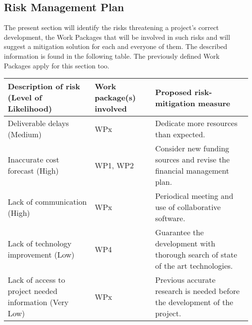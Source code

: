 \subsection{Risk Management Plan}

The present section will identify the risks threatening a project's correct development, the Work Packages that will be involved in such risks and will suggest a mitigation solution for each and everyone of them. The described information is found in the following table. The previously defined Work Packages apply for this section too.

\begin{longtable}[H]{>{\raggedright\arraybackslash}p{4cm} p{4.7cm} p{5cm}}
	
	\toprule[2pt]
	
	\textbf{Description of risk (Level of Likelihood)} & \textbf{Work package(s) involved} & \textbf{Proposed risk-mitigation measure} \\
	
	\midrule[1.5pt] 
	\endhead
	
	Deliverable delays (Medium) & WPx & Dedicate more resources than expected. \vspace{0.2cm} \\
	
	\midrule
	
	Inaccurate cost forecast (High) & WP1, WP2 & Consider new funding sources and revise the financial management plan. \vspace{0.2cm} \\
	
	\midrule
	
	Lack of communication (High) & WPx & Periodical meeting and use of collaborative software.  \vspace{0.2cm} \\
	
	\midrule
	
	Lack of technology improvement (Low) & WP4 & Guarantee the development with thorough search of state of the art technologies.  \vspace{0.2cm} \\
	
	\midrule
	
	Lack of access to project needed information (Very Low) & WPx & Previous accurate research is needed before the development of the project. \vspace{0.2cm} \\
	
	\midrule
	

\end{longtable}
